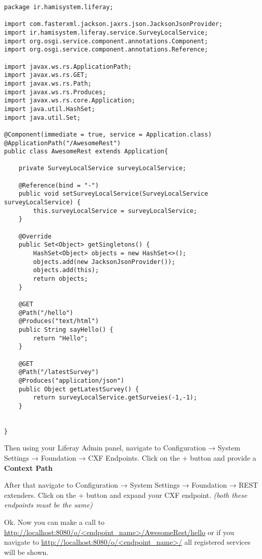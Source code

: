 \lstset{language=Java}
\begin{minipage}{\linewidth}
\begin{lstlisting}[caption=AwesomeRest.java]
package ir.hamisystem.liferay;

import com.fasterxml.jackson.jaxrs.json.JacksonJsonProvider;
import ir.hamisystem.liferay.service.SurveyLocalService;
import org.osgi.service.component.annotations.Component;
import org.osgi.service.component.annotations.Reference;

import javax.ws.rs.ApplicationPath;
import javax.ws.rs.GET;
import javax.ws.rs.Path;
import javax.ws.rs.Produces;
import javax.ws.rs.core.Application;
import java.util.HashSet;
import java.util.Set;

@Component(immediate = true, service = Application.class)
@ApplicationPath("/AwesomeRest")
public class AwesomeRest extends Application{

    private SurveyLocalService surveyLocalService;

    @Reference(bind = "-")
    public void setSurveyLocalService(SurveyLocalService surveyLocalService) {
        this.surveyLocalService = surveyLocalService;
    }

    @Override
    public Set<Object> getSingletons() {
        HashSet<Object> objects = new HashSet<>();
        objects.add(new JacksonJsonProvider());
        objects.add(this);
        return objects;
    }

    @GET
    @Path("/hello")
    @Produces("text/html")
    public String sayHello() {
        return "Hello";
    }

    @GET
    @Path("/latestSurvey")
    @Produces("application/json")
    public Object getLatestSurvey() {
        return surveyLocalService.getSurveies(-1,-1);
    }


}
\end{lstlisting}
\end{minipage}


Then using your Liferay Admin panel, navigate to  Configuration → System Settings → Foundation → CXF Endpoints. Click on the + button and provide a \textbf{Context Path}

After that navigate to Configuration → System Settings → Foundation → REST extenders. Click on the + button and expand your CXF endpoint. \textit{(both these endpoints must be the same)}

Ok. Now you can make a call to \url{http://localhost:8080/o/<endpoint_name>/AwesomeRest/hello} or if you navigate to \url{http://localhost:8080/o/<endpoint_name>/} all registered services will be shown.